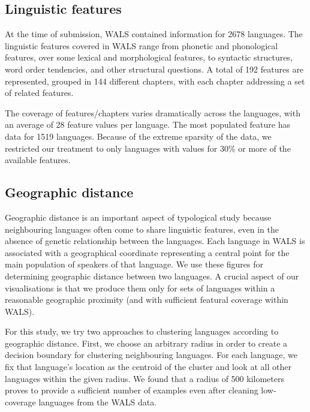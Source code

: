 \documentclass[11pt]{article}
\begin{document}
\subsection{Linguistic features}
At the time of submission, WALS contained information for 2678 languages. The linguistic features covered in WALS range from phonetic and phonological features, over some lexical and morphological features, to syntactic structures, word order tendencies, and other structural questions. A total of 192 features are represented, grouped in 144 different chapters, with each chapter addressing a set of related features. 

The coverage of features/chapters varies dramatically across the languages, with an average of 28 feature values per language. The most populated feature has data for 1519 languages. Because of the extreme sparsity of the data, we restricted our treatment to only languages with values for 30\% or more of the available features. 


\subsection{Geographic distance}
Geographic distance is an important aspect of typological study because neighbouring  languages often come to share linguistic features, even in the absence of genetic relationship between the languages. Each language in WALS is associated with a geographical coordinate representing a central point for the main population of speakers of that language. We use these figures for determining geographic distance between two languages. A crucial aspect of our visualisations is that we produce them only for sets of languages within a reasonable geographic proximity (and with sufficient featural coverage within WALS).

For this study, we try two approaches to clustering languages according to geographic distance. First, we choose an arbitrary radius in order to create a decision boundary for clustering neighbouring languages. For each language, we fix that language's location as the centroid of the cluster and look at all other languages within the given radius. We found that a radius of 500 kilometers proves to provide a sufficient number of examples even after cleaning low-coverage languages from the WALS data. 
\end{document}
